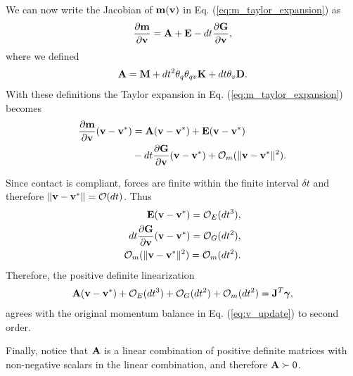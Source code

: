 We can now write the Jacobian of ${\mathbf{m}}({\mathbf{v}})$ in Eq.
(\ref{eq:m_taylor_expansion}) as
\begin{align*}
	\frac{\partial {\mathbf{m}}}{\partial {\mathbf{v}}} = {\mathbf{A}} + {\mathbf{E}} - dt\frac{\partial {\mathbf{G}}}{\partial {\mathbf{v}}},
\end{align*}
where we defined
\begin{align*}
	{\mathbf{A}}={\mathbf{M}}+ dt^2\theta_q\theta_{qv}{\mathbf{K}}+dt\theta_v{\mathbf{D}}.
\end{align*}
With these definitions the Taylor expansion in Eq. (\ref{eq:m_taylor_expansion})
becomes
\begin{align*}
	\frac{\partial{\mathbf{m}}}{\partial{\mathbf{v}}}({\mathbf{v}}-{\mathbf{v}}^*) &= {\mathbf{A}}({\mathbf{v}}-{\mathbf{v}}^*) + {\mathbf{E}}({\mathbf{v}}-{\mathbf{v}}^*) \\
	&- dt\frac{\partial{\mathbf{G}}}{\partial{\mathbf{v}}}({\mathbf{v}}-{\mathbf{v}}^*) + \mathcal{O}_m(\Vert{\mathbf{v}}-{\mathbf{v}}^*\Vert^2).
\end{align*}

Since contact is compliant, forces are finite within the finite interval $\delta
t$ and therefore $\Vert{\mathbf{v}}-{\mathbf{v}}^*\Vert=\mathcal{O}(dt)$. Thus
\begin{align*}
	{\mathbf{E}}({\mathbf{v}}-{\mathbf{v}}^*)=\mathcal{O}_E(dt^3), \\
    dt\frac{\partial {\mathbf{G}}}{\partial {\mathbf{v}}}({\mathbf{v}}-{\mathbf{v}}^*)=\mathcal{O}_G(dt^2), \\ 
    \mathcal{O}_m(\Vert{\mathbf{v}}-{\mathbf{v}}^*\Vert^2) = \mathcal{O}_m(dt^2).
\end{align*}
Therefore, the positive definite linearization
\begin{align*}
	{\mathbf{A}}({\mathbf{v}}-{\mathbf{v}}^*) + \mathcal{O}_E(dt^3) + \mathcal{O}_G(dt^2) +
	\mathcal{O}_m(dt^2) = {\mathbf{J}}^T{\mathbf{{\bm\gamma}}},
\end{align*}
agrees with the original momentum balance in Eq. (\ref{eq:v_update}) to second
order.

Finally, notice that ${\mathbf{A}}$ is a linear combination of positive definite
matrices with non-negative scalars in the linear combination, and therefore
${\mathbf{A}}\succ 0$.\hfill\IEEEQED
